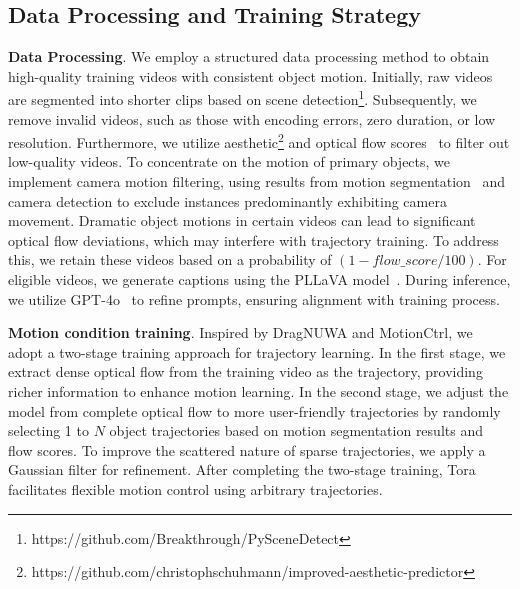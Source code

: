 \subsection{Data Processing and Training Strategy}

\noindent \textbf{Data Processing}. We employ a structured data processing method to obtain high-quality training videos with consistent object motion. Initially, raw videos are segmented into shorter clips based on scene detection\footnote{https://github.com/Breakthrough/PySceneDetect}. Subsequently, we remove invalid videos, such as those with encoding errors, zero duration, or low resolution. Furthermore, we utilize aesthetic\footnote{https://github.com/christophschuhmann/improved-aesthetic-predictor} and optical flow scores~\cite{DBLP:journals/pami/XuZCRYTG23} to filter out low-quality videos. To concentrate on the motion of primary objects, we implement camera motion filtering, using results from motion segmentation~\cite{DBLP:conf/eccv/ZhaoLGWL22} and camera detection to exclude instances predominantly exhibiting camera movement. Dramatic object motions in certain videos can lead to significant optical flow deviations, which may interfere with trajectory training. To address this, we retain these videos based on a probability of $(1 - flow\_score / 100)$.  For eligible videos, we generate captions using the PLLaVA model~\cite{DBLP:journals/corr/abs-2404-16994}. During inference, we utilize GPT-4o~\cite{DBLP:journals/corr/abs-2303-08774} to refine prompts, ensuring alignment with training process. 

\noindent \textbf{Motion condition training}. Inspired by DragNUWA and MotionCtrl, we adopt a two-stage training approach for trajectory learning. In the first stage, we extract dense optical flow \cite{DBLP:journals/pami/XuZCRYTG23} from the training video as the trajectory, providing richer information to enhance motion learning. In the second stage, we adjust the model from complete optical flow to more user-friendly trajectories by randomly selecting 1 to $N$  object trajectories based on motion segmentation results and flow scores. To improve the scattered nature of sparse trajectories, we apply a Gaussian filter for refinement. After completing the two-stage training, Tora facilitates flexible motion control using arbitrary trajectories.

